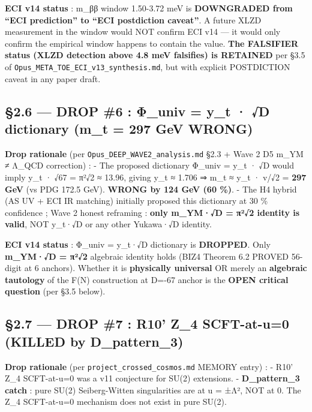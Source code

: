 \documentclass[
  11pt,
  a4paper,
]{article}
\begin{document}
\textbf{ECI v14 status} : m\_ββ window 1.50-3.72 meV is \textbf{DOWNGRADED from ``ECI prediction'' to ``ECI postdiction caveat''}. A future XLZD measurement in the window would NOT confirm ECI v14 --- it would only confirm the empirical window happens to contain the value. \textbf{The FALSIFIER status (XLZD detection above 4.8 meV falsifies) is RETAINED} per §3.5 of \texttt{Opus\_META\_TOE\_ECI\_v13\_synthesis.md}, but with explicit POSTDICTION caveat in any paper draft.

\hypertarget{drop-6-ux3c6_univ-y_t-d-dictionary-m_t-297-gev-wrong}{%
\subsection{§2.6 --- DROP \#6 : Φ\_univ = y\_t · √\textbar D\textbar{} dictionary (m\_t = 297 GeV WRONG)}\label{drop-6-ux3c6_univ-y_t-d-dictionary-m_t-297-gev-wrong}}

\textbf{Drop rationale} (per \texttt{Opus\_DEEP\_WAVE2\_analysis.md} §2.3 + Wave 2 D5 m\_YM ≠ Λ\_QCD correction) :
- The proposed dictionary Φ\_univ = y\_t · √\textbar D\textbar{} would imply y\_t · √67 = π²√2 ≈ 13.96, giving y\_t ≈ 1.706 ⇒ m\_t ≈ y\_t · v/√2 = \textbf{297 GeV} (vs PDG 172.5 GeV). \textbf{WRONG by 124 GeV (60 \%)}.
- The H4 hybrid (AS UV + ECI IR matching) initially proposed this dictionary at 30 \% confidence ; Wave 2 honest reframing : \textbf{only m\_YM·√\textbar D\textbar{} = π²√2 identity is valid}, NOT y\_t·√\textbar D\textbar{} or any other Yukawa·√\textbar D\textbar{} identity.

\textbf{ECI v14 status} : Φ\_univ = y\_t·√\textbar D\textbar{} dictionary is \textbf{DROPPED}. Only \textbf{m\_YM·√\textbar D\textbar{} = π²√2} algebraic identity holds (BIZ4 Theorem 6.2 PROVED 56-digit at 6 anchors). Whether it is \textbf{physically universal} OR merely an \textbf{algebraic tautology} of the F(N) construction at D=-67 anchor is the \textbf{OPEN critical question} (per §3.5 below).

\hypertarget{drop-7-r10-z_4-scft-at-u0-killed-by-d_pattern_3}{%
\subsection{§2.7 --- DROP \#7 : R10' Z\_4 SCFT-at-u=0 (KILLED by D\_pattern\_3)}\label{drop-7-r10-z_4-scft-at-u0-killed-by-d_pattern_3}}

\textbf{Drop rationale} (per \texttt{project\_crossed\_cosmos.md} MEMORY entry) :
- R10' Z\_4 SCFT-at-u=0 was a v11 conjecture for SU(2) extensions.
- \textbf{D\_pattern\_3 catch} : pure SU(2) Seiberg-Witten singularities are at u = ±Λ², NOT at 0. The Z\_4 SCFT-at-u=0 mechanism does not exist in pure SU(2).
\end{document}
